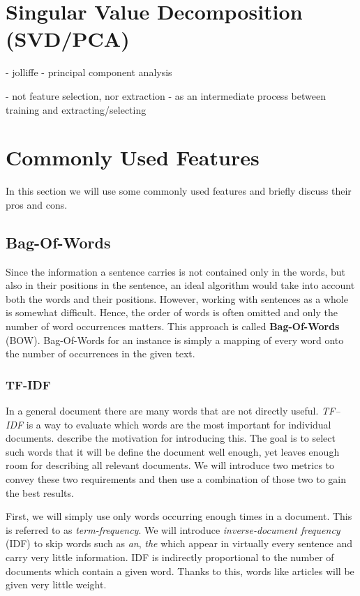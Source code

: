 \section{Singular Value Decomposition (SVD/PCA)}

- jolliffe - principal component analysis

 - not feature selection, nor extraction
 - as an intermediate process between training and extracting/selecting

\section{Commonly Used Features}

In this section we will use some commonly used features and briefly discuss their pros and cons.

\subsection{Bag-Of-Words}
\label{subsec:bow}

Since the information a sentence carries is not contained only in the words, but also in their positions in the sentence, an ideal algorithm would take into account both the words and their positions.
However, working with sentences as a whole is somewhat difficult. Hence, the order of words is often omitted and only the number of word occurrences matters.
This approach is called {\bf Bag-Of-Words} (BOW). Bag-Of-Words for an instance is simply a mapping of every word onto the number of occurrences in the given text.

\subsubsection{TF-IDF}

In a general document there are many words that are not directly useful.
{\it TF--IDF} is a way to evaluate which words are the most important for individual documents.  
\citet{SalBuc88} describe the motivation for introducing this.
The goal is to select such words that it will be define the document well enough, yet leaves enough room for describing all relevant documents.
We will introduce two metrics to convey these two requirements and then use a combination of those two to gain the best results.

First, we will simply use only words occurring enough times in a document. This is referred to as {\it term-frequency}.
We will introduce {\it inverse-document frequency} (IDF) to skip words such as {\it an}, {\it the} which appear in virtually every sentence and carry very little information.
IDF is indirectly proportional to the number of documents which contain a given word.
Thanks to this, words like articles will be given very little weight.


